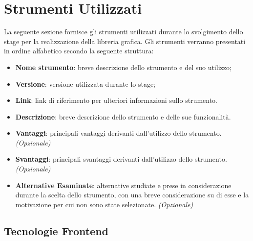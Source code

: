 \section{Strumenti Utilizzati}
La seguente sezione fornisce gli strumenti utilizzati durante lo svolgimento dello stage per la realizzazione della libreria grafica.
Gli strumenti verranno presentati in ordine alfabetico secondo la seguente struttura:
\begin{itemize}
      \item \textbf{Nome strumento}: breve descrizione dello strumento e del suo utilizzo;
      \item \textbf{Versione}: versione utilizzata durante lo stage;
      \item \textbf{Link}: link di riferimento per ulteriori informazioni sullo strumento.
      \item \textbf{Descrizione}: breve descrizione dello strumento e delle sue funzionalità.
      \item \textbf{Vantaggi}: principali vantaggi derivanti dall'utilizzo dello strumento. \textit{(Opzionale)}
      \item \textbf{Svantaggi}: principali svantaggi derivanti dall'utilizzo dello strumento. \textit{(Opzionale)}
      \item \textbf{Alternative Esaminate}: alternative studiate e prese in considerazione durante la scelta dello strumento, con una breve considerazione
            su di esse e la motivazione per cui non sono state selezionate. \textit{(Opzionale)}
\end{itemize}

\subsection{Tecnologie Frontend}


